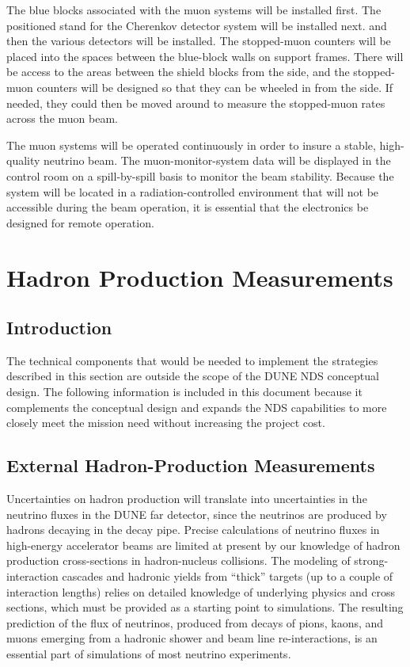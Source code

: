 The blue blocks associated with the muon systems will be installed
first.  The positioned stand for the Cherenkov detector system will be
installed next.  and then the various detectors will be installed.
The stopped-muon counters will be placed into the spaces between the
blue-block walls on support frames.  There will be access to the areas
between the shield blocks from the side, and the stopped-muon counters
will be designed so that they can be wheeled in from the side.  If
needed, they could then be moved around to measure the stopped-muon
rates across the muon beam.

The muon systems will be operated continuously in order to insure a
stable, high-quality neutrino beam.  The muon-monitor-system data will
be displayed in the control room on a spill-by-spill basis to monitor
the beam stability. Because the system will be located in a
radiation-controlled environment that will not be accessible during
the beam operation, it is essential that the electronics be designed
for remote operation.

\section{Hadron Production Measurements}
\label{sec:detectors-nd-ref-hadron}

\subsection{Introduction}

The technical components that would be needed to implement the
strategies described in this section are outside the scope of the DUNE
NDS conceptual design. The following information is included in this document
because it complements the conceptual design and expands the NDS
capabilities to more closely meet the mission need without increasing
the project cost.

\subsection{External Hadron-Production Measurements}
\label{sec:detectors-nd-external-hadron}

Uncertainties on hadron production will translate into uncertainties
in the neutrino fluxes in the DUNE far detector, since the neutrinos
are produced by hadrons decaying in the decay pipe. Precise
calculations of neutrino fluxes in high-energy accelerator beams are
limited at present by our knowledge of hadron production
cross-sections in hadron-nucleus collisions.  The modeling of
strong-interaction cascades and hadronic yields from ``thick'' targets
(up to a couple of interaction lengths) relies on detailed knowledge
of underlying physics and cross sections, which must be provided as a
starting point to simulations. The resulting prediction of the flux of
neutrinos, produced from decays of pions, kaons, and muons emerging
from a hadronic shower and beam line re-interactions, is an essential
part of simulations of most neutrino experiments.

